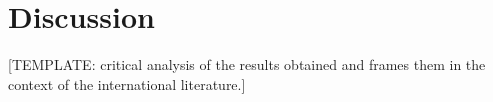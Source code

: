 \chapter{Discussion} %

[TEMPLATE: critical analysis of the results obtained and frames them in the context of the international literature.]
